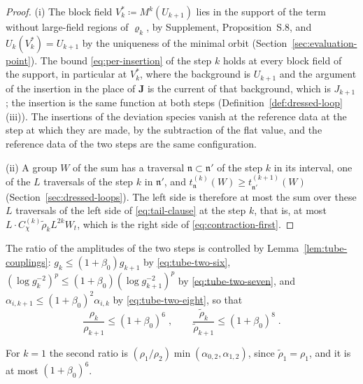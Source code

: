 \documentclass[11pt]{preprint}
\numberwithin{equation}{section}
\theoremstyle{definition}
\theoremstyle{remark}
\theoremstyle{plain}
\begin{document}
\begin{proof}
(i) The block field $V^*_k \coloneqq M^k(U_{k+1})$ lies in the support of the term without large-field regions of $\varrho_k$, by Supplement, Proposition~S.8, and $U_k(V^*_k) = U_{k+1}$ by the uniqueness of the minimal orbit (Section~\ref{sec:evaluation-point}). The bound \eqref{eq:per-insertion} of the step $k$ holds at every block field of the support, in particular at $V^*_k$, where the background is $U_{k+1}$ and the argument of the insertion in the place of $\mathbf J$ is the current of that background, which is $J_{k+1}$; the insertion is the same function at both steps (Definition~\ref{def:dressed-loop}(iii)). The insertions of the deviation species vanish at the reference data at the step at which they are made, by the subtraction of the flat value, and the reference data of the two steps are the same configuration.

(ii) A group $W$ of the sum has a traversal $\mathfrak n \subset \mathfrak n'$ of the step $k$ in its interval, one of the $L$ traversals of the step $k$ in $\mathfrak n'$, and $t^{(k)}_{\mathfrak n}(W) \geq t^{(k+1)}_{\mathfrak n'}(W)$ (Section~\ref{sec:dressed-loops}). The left side is therefore at most the sum over these $L$ traversals of the left side of \eqref{eq:tail-clause} at the step $k$, that is, at most $L \cdot C^{(k)}_\chi\tilde\rho_kL^{2k}W_t$, which is the right side of \eqref{eq:contraction-first}.
\end{proof}

The ratio of the amplitudes of the two steps is controlled by Lemma~\ref{lem:tube-couplings}: $g_k \leq (1 + \beta_0)g_{k+1}$ by \eqref{eq:tube-two-six}, $(\log g_k^{-2})^p \leq (1 + \beta_0)(\log g_{k+1}^{-2})^p$ by \eqref{eq:tube-two-seven}, and $\alpha_{i,k+1} \leq (1 + \beta_0)^2\alpha_{i,k}$ by \eqref{eq:tube-two-eight}, so that
\begin{equation}\label{eq:rho-ratio}
    \frac{\rho_k}{\rho_{k+1}} \leq (1 + \beta_0)^6\;,
    \qquad
    \frac{\tilde\rho_k}{\tilde\rho_{k+1}} \leq (1 + \beta_0)^8\;.
\end{equation}

For $k = 1$ the second ratio is $(\rho_1/\rho_2)\min(\alpha_{0,2}, \alpha_{1,2})$, since $\tilde\rho_1 = \rho_1$, and it is at most $(1 + \beta_0)^6$.
\end{document}
